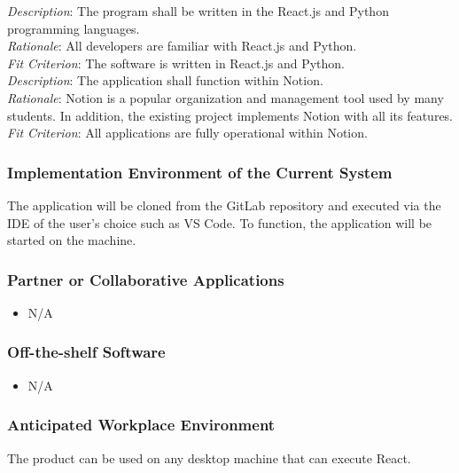 \documentclass[12pt, titlepage]{article}
\begin{document}
\emph{Description}: The program shall be written in the React.js and Python programming languages.\\
\emph{Rationale}: All developers are familiar with React.js and Python.\\
\emph{Fit Criterion}: The software is written in React.js and Python. \\


\noindent\emph{Description}: The application shall function within Notion. \\
\emph{Rationale}: Notion is a popular organization and management tool used by many students. In addition, the existing project implements Notion with all its features.\\
\emph{Fit Criterion}: All applications are fully operational within Notion.

\subsubsection{Implementation Environment of the Current System}

The application will be cloned from the GitLab repository and executed via the IDE of the user’s choice such as VS Code. To function, the application will be started on the machine.  

\subsubsection{Partner or Collaborative Applications}

\begin{itemize}
  \item[] N/A
\end{itemize}

\subsubsection{Off-the-shelf Software}

\begin{itemize}
  \item[] N/A
\end{itemize}

\subsubsection{Anticipated Workplace Environment}

The product can be used on any desktop machine that can execute React. 
\end{document}
